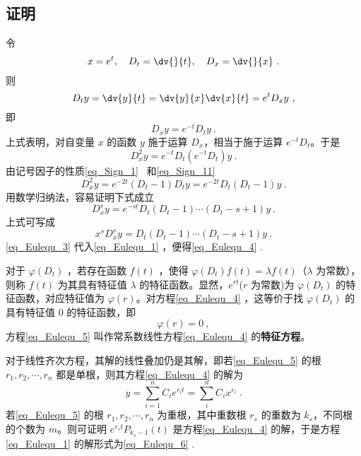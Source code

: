\subsection{证明}
令
\begin{equation}
x=e^t,\quad D_t=\dv{}{t},\quad D_x=\dv{}{x}~.
\end{equation}
则
\begin{equation}
D_ty=\dv{y}{t}=\dv{y}{x}\dv{x}{t}=e^tD_xy~,
\end{equation}
即
\begin{equation}
D_xy=e^{-t}D_ty~.
\end{equation}
上式表明，对自变量 $x$ 的函数 $y$ 施于运算 $D_x$，相当于施于运算 $e^{-t}D_t$。于是
\begin{equation}
D_x^2y=e^{-t}D_t(e^{-t}D_t)y~.
\end{equation}
由记号因子的性质\autoref{eq_Sign_1}~ 和\autoref{eq_Sign_11}~
\begin{equation}
D_x^2y=e^{-2t}(D_t-1)D_ty=e^{-2t}D_t(D_t-1)y~.
\end{equation}
用数学归纳法，容易证明下式成立
\begin{equation}
D_x^sy=e^{-st}D_t(D_t-1)\cdots (D_t-s+1)y~.
\end{equation}
上式可写成
\begin{equation}\label{eq_Eulequ_3}
x^sD_x^sy=D_t(D_t-1)\cdots (D_t-s+1)y~.
\end{equation}
\autoref{eq_Eulequ_3} 代入\autoref{eq_Eulequ_1} ，便得\autoref{eq_Eulequ_4} .

对于 $\varphi(D_t)$ ，若存在函数 $f(t)$ ，使得
$\varphi(D_t)f(t)=\lambda f(t)$（$\lambda$ 为常数），则称 $f(t)$ 为其具有特征值 $\lambda$ 的特征函数。显然，$e^{rt}$($r$ 为常数)为 $\varphi(D_t)$ 的特征函数，对应特征值为 $\varphi(r)$。对方程\autoref{eq_Eulequ_4} ，这等价于找 $\varphi(D_t)$ 的具有特征值 $0$ 的特征函数，即
\begin{equation}\label{eq_Eulequ_5}
\varphi(r)=0~,
\end{equation}
方程\autoref{eq_Eulequ_5} 叫作常系数线性方程\autoref{eq_Eulequ_4} 的\textbf{特征方程}。

对于线性齐次方程，其解的线性叠加仍是其解，即若\autoref{eq_Eulequ_5} 的根 $r_1,r_2,\cdots,r_n$ 都是单根，则其方程\autoref{eq_Eulequ_4} 的解为
\begin{equation}
y=\sum_{i=1}^{n}C_ie^{r_it}=\sum_i^{n}C_ix^{r_i}~.
\end{equation}
 若\autoref{eq_Eulequ_5} 的根 $r_1,r_2,\cdots,r_n$ 为重根，其中重数根 $r_s$ 的重数为 $k_s$，不同根的个数为 $m$。则可证明 $e^{r_st}P_{k_s-1}(t)$ 是方程\autoref{eq_Eulequ_4} 的解，于是方程\autoref{eq_Eulequ_1} 的解形式为\autoref{eq_Eulequ_6} .
